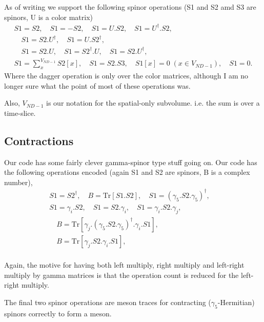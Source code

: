 As of writing we support the following spinor operations (S1 
and S2 amd S3 are spinors, U is a color matrix)
\begin{equation}
\begin{gathered}
S1=S2, \quad S1=-S2, \quad S1 = U.S2, \quad S1 = U^{\dagger}.S2, \\
\quad S1 = S2.U^{\dagger}, \quad S1=U.S2^{\dagger}, \\
\quad S1 = S2.U , \quad S1 = S2^{\dagger}.U, \quad S1=S2.U^{\dagger},\\
S1=\sum_{x}^{V_{ND-1}}S2[x], \quad S1 = S2.S3, 
\quad S1[x] = 0 \; (x\in V_{ND-1}), \quad S1=0.
\end{gathered}
\end{equation}
Where the dagger operation is only over the color matrices,
although I am no longer sure what the point of most of these
operations was.

Also, $V_{ND-1}$ is our notation for the spatial-only subvolume.
i.e. the sum is over a time-slice.

\subsection{Contractions}

Our code has some fairly clever gamma-spinor type stuff going
on. Our code has the following operations encoded (again
S1 and S2 are spinors, B is a complex number),
\begin{equation}
\begin{gathered}
S1 = S2^{\dagger}, \quad B=\text{Tr}\left[ S1.S2 \right], 
\quad S1 = \left( \gamma_5.S2.\gamma_5 \right)^{\dagger},\quad \\
S1 = \gamma_i.S2, \quad S1 = S2.\gamma_i,
\quad S1 = \gamma_i.S2.\gamma_j, \\
\quad B = \text{Tr}\left[ \gamma_j.\left( \gamma_5.S2.\gamma_5\right)^{\dagger}.\gamma_i.S1\right], \\
\quad B = \text{Tr}\left[ \gamma_j.S2.\gamma_i.S1\right], \\
\end{gathered}
\end{equation}

Again, the motive for having both left multiply, right multiply
and left-right multiply by gamma matrices is that the operation
count is reduced for the left-right multiply.

The final two spinor operations are meson traces for contracting
($\gamma_5$-Hermitian) spinors correctly to form a meson.

